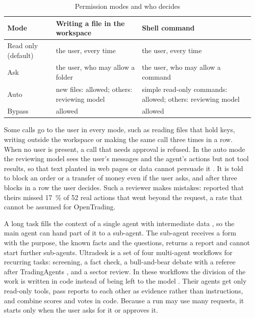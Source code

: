 \begin{table}[H]
  \centering
  \caption{Permission modes and who decides}\label{tab:permission-modes}
  \begin{tabularx}{\textwidth}{@{}l L L@{}}
    \toprule
    {Mode} & {Writing a file in the workspace} & {Shell command}\\
    \midrule
    Read only (default) & the user, every time & the user, every time\\
    Ask & the user, who may allow a folder & the user, who may allow a command\\
    \addlinespace[2pt]
    Auto & new files: allowed; others: reviewing model & simple read-only commands: allowed; others: reviewing model\\
    \addlinespace[2pt]
    Bypass & allowed & allowed\\
    \bottomrule
  \end{tabularx}
\end{table}

Some calls go to the user in every mode, such as reading files that hold keys, writing outside the workspace or making the same call three times in a row.
When no user is present, a call that needs approval is refused.
In the auto mode the reviewing model sees the user's messages and the agent's actions but not tool results, so that text planted in web pages or data cannot persuade it \parencite{greshake2023injection}.
It is told to block an order or a transfer of money even if the user asks, and after three blocks in a row the user decides.
Such a reviewer makes mistakes: \textcite{anthropic2026auto} reported that theirs missed \qty{17}{\percent} of 52 real actions that went beyond the request, a rate that cannot be assumed for OpenTrading.

\label{sec:multi-agent}
A long task fills the context of a single agent with intermediate data \parencite{anthropic2025multiagent}, so the main agent can hand part of it to a sub-agent.
The sub-agent receives a form with the purpose, the known facts and the questions, returns a report and cannot start further sub-agents.
Ultradesk is a set of four multi-agent workflows for recurring tasks: screening, a fact check, a bull-and-bear debate with a referee after TradingAgents \parencite{xiao2024tradingagents}, and a sector review.
In these workflows the division of the work is written in code instead of being left to the model \parencite{anthropic2024agents}.
Their agents get only read-only tools, pass reports to each other as evidence rather than instructions, and combine scores and votes in code.
Because a run may use many requests, it starts only when the user asks for it or approves it.

